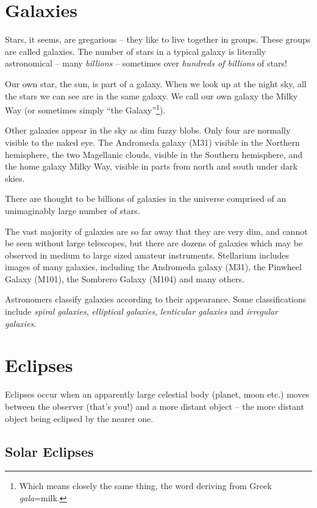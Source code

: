 \section{Galaxies}
\label{sec:Phenomena:Galaxies}

Stars, it seems, are gregarious -- they like to live together in groups.
These groups are called galaxies. The number of stars in a typical
galaxy is literally astronomical -- many \emph{billions} -- sometimes over
\emph{hundreds of billions} of stars!

Our own star, the sun, is part of a galaxy. When we look up at the
night sky, all the stars we can see are in the same galaxy. We call
our own galaxy the Milky Way (or sometimes simply ``the
Galaxy''\footnote{Which means closely the same thing, the word
  deriving from Greek \emph{gala}=milk.}).

Other galaxies appear in the sky as dim fuzzy blobs. Only four are
normally visible to the naked eye. The Andromeda galaxy (M31) visible in
the Northern hemisphere, the two Magellanic clouds, visible in the
Southern hemisphere, and the home galaxy Milky Way, visible in parts
from north and south under dark skies.

There are thought to be billions of galaxies in the universe comprised
of an unimaginably large number of stars.

The vast majority of galaxies are so far away that they are very dim,
and cannot be seen without large telescopes, but there are dozens of
galaxies which may be observed in medium to large sized amateur
instruments. Stellarium includes images of many galaxies, including the
Andromeda galaxy (M31), the Pinwheel Galaxy (M101), the Sombrero Galaxy
(M104) and many others.

Astronomers classify galaxies according to their appearance. Some
classifications include \emph{spiral galaxies}, \emph{elliptical
galaxies}, \emph{lenticular galaxies} and \emph{irregular galaxies}.



\section{Eclipses}
\label{sec:Eclipses}

Eclipses occur when an apparently large celestial body (planet, moon
etc.) moves between the observer (that's you!) and a more distant object
-- the more distant object being eclipsed by the nearer one.

\subsection{Solar Eclipses}
\label{sec:Eclipses:solar}

